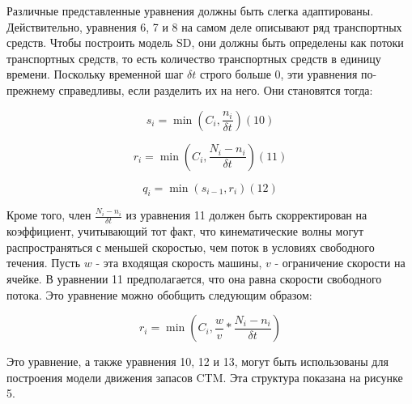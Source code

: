 
Различные представленные уравнения должны быть слегка адаптированы. Действительно, уравнения 6, 7 и 8 на самом деле описывают ряд транспортных средств. Чтобы построить модель SD, они должны быть определены как потоки транспортных средств, то есть количество транспортных средств в единицу времени. Поскольку временной шаг $\delta t$ строго больше 0, эти уравнения по-прежнему справедливы, если разделить их на него. Они становятся тогда:

\begin{equation}
    s_i = \min(C_i, \frac{n_i}{\delta t}) (10)
\end{equation}

\begin{equation}
    r_i = \min(C_i, \frac{N_i − n_i}{\delta t}) (11)
\end{equation}

\begin{equation}
    q_i = \min(s_{i−1}, r_i) (12)
\end{equation}


Кроме того, член $\frac{N_i − n_i}{\delta t}$ из уравнения 11 должен быть скорректирован на коэффициент, учитывающий тот факт, что кинематические волны могут распространяться с меньшей скоростью, чем поток в условиях свободного течения. Пусть $w$ - эта входящая скорость машины, $v$ - ограничение скорости на ячейке. В уравнении 11 предполагается, что она равна скорости свободного потока. Это уравнение можно обобщить следующим образом:

\begin{equation}
    r_i = \min(C_i, \frac{w}{v} * \frac{N_i − n_i}{δt})
\end{equation}


Это уравнение, а также уравнения 10, 12 и 13, могут быть использованы для построения модели движения запасов CTM. Эта структура показана на рисунке 5.

\clearpage
